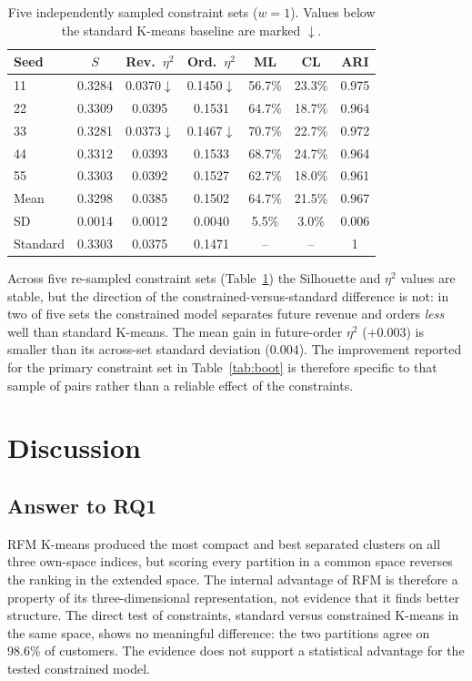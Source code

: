 \documentclass[conference,10pt]{IEEEtran}
\newcommand{\etasq}{\eta^{2}}
\begin{document}
\begin{table}[t]
\centering
\caption{Five independently sampled constraint sets ($w=1$). Values below
the standard K-means baseline are marked $\downarrow$.}
\label{tab:robust}
\footnotesize
\setlength{\tabcolsep}{3pt}
\begin{tabular}{lcccccc}
\toprule
\textbf{Seed} & \textbf{$S$} & \textbf{Rev.\ $\etasq$} & \textbf{Ord.\ $\etasq$} & \textbf{ML} & \textbf{CL} & \textbf{ARI}\\
\midrule
11 & 0.3284 & 0.0370$\downarrow$ & 0.1450$\downarrow$ & 56.7\% & 23.3\% & 0.975\\
22 & 0.3309 & 0.0395 & 0.1531 & 64.7\% & 18.7\% & 0.964\\
33 & 0.3281 & 0.0373$\downarrow$ & 0.1467$\downarrow$ & 70.7\% & 22.7\% & 0.972\\
44 & 0.3312 & 0.0393 & 0.1533 & 68.7\% & 24.7\% & 0.964\\
55 & 0.3303 & 0.0392 & 0.1527 & 62.7\% & 18.0\% & 0.961\\
\midrule
Mean & 0.3298 & 0.0385 & 0.1502 & 64.7\% & 21.5\% & 0.967\\
SD   & 0.0014 & 0.0012 & 0.0040 & 5.5\% & 3.0\% & 0.006\\
\midrule
Standard & 0.3303 & 0.0375 & 0.1471 & -- & -- & 1\\
\bottomrule
\end{tabular}
\end{table}

Across five re-sampled constraint sets (Table~\ref{tab:robust}) the
Silhouette and $\etasq$ values are stable, but the direction of the
constrained-versus-standard difference is not: in two of five sets the
constrained model separates future revenue and orders \emph{less} well than
standard K-means. The mean gain in future-order $\etasq$ (+0.003) is smaller
than its across-set standard deviation (0.004). The improvement reported for
the primary constraint set in Table~\ref{tab:boot} is therefore specific to
that sample of pairs rather than a reliable effect of the constraints.

\section{Discussion}
\label{sec:discussion}

\subsection{Answer to RQ1}
RFM K-means produced the most compact and best separated clusters on all
three own-space indices, but scoring every partition in a common space
reverses the ranking in the extended space. The internal advantage of RFM is
therefore a property of its three-dimensional representation, not evidence
that it finds better structure. The direct test of constraints, standard
versus constrained K-means in the same space, shows no meaningful difference:
the two partitions agree on 98.6\% of customers. The evidence does not
support a statistical advantage for the tested constrained model.
\end{document}
